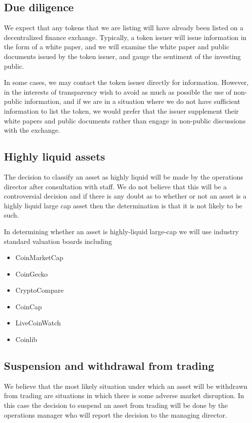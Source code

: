 \subsection{Due diligence}

We expect that any tokens that we are listing will have already been
listed on a decentralized finance exchange.  Typically, a token issuer
will issue information in the form of a white paper, and we will
examine the white paper and public documents issued by the token
issuer, and gauge the sentiment of the investing public.

In some cases, we may contact the token issuer directly for
information.  However, in the interests of transparency wish to avoid
as much as possible the use of non-public information, and if we are
in a situation where we do not have sufficient information to list the
token, we would prefer that the issuer supplement their white papers
and public documents rather than engage in non-public discussions with
the exchange.

\subsection{Highly liquid assets}

The decision to classify an asset as highly liquid will be made by the
operations director after consultation with staff.  We do not believe
that this will be a controversial decision and if there is any doubt
as to whether or not an asset is a highly liquid large cap asset then
the determination is that it is not likely to be such.

In determining whether an asset is highly-liquid large-cap we will
use industry standard valuation boards including
\begin{itemize}
\item CoinMarketCap
\item CoinGecko
\item CryptoCompare
\item CoinCap
\item LiveCoinWatch
\item Coinlib
\end{itemize}

\subsection{Suspension and withdrawal from trading}
We believe that the most likely situation under which an asset will be
withdrawn from trading are situations in which there is some adverse
market disruption.  In this case the decision to suspend an asset from
trading will be done by the operations manager who will report the
decision to the managing director.

